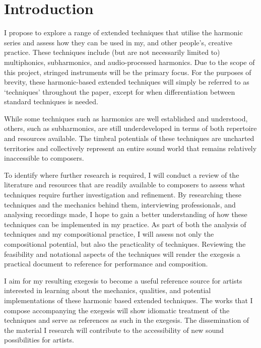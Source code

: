 \section{Introduction}
I propose to explore a range of extended techniques that utilise the harmonic series and assess how they can be used in my, and other people's, creative practice. These techniques include (but are not necessarily limited to) multiphonics, subharmonics, and audio-processed harmonics. Due to the scope of this project, stringed instruments will be the primary focus. For the purposes of brevity, these harmonic-based extended techniques will simply be referred to as `techniques' throughout the paper, except for when differentiation between standard techniques is needed. 

While some techniques such as harmonics are well established and understood, others, such as subharmonics, are still underdeveloped in terms of both repertoire and resources available.  The timbral potentials of these techniques are uncharted territories and collectively represent an entire sound world that remains relatively inaccessible to composers.

To identify where further research is required, I will conduct a review of the literature and resources that are readily available to composers to assess what techniques require further investigation and refinement. By researching these techniques and the mechanics behind them, interviewing professionals, and analysing recordings made, I hope to gain a better understanding of how these techniques can be implemented in my practice. As part of both the analysis of techniques and my compositional practice, I will assess not only the compositional potential, but also the practicality of techniques. Reviewing the feasibility and notational aspects of the techniques will render the exegesis a practical document to reference for performance and composition.

I aim for my resulting exegesis to become a useful reference source for artists interested in learning about the mechanics, qualities, and potential implementations of these harmonic based extended techniques. The works that I compose accompanying the exegesis will show idiomatic treatment of the techniques and serve as references as such in the exegesis. The dissemination of the material I research will contribute to the accessibility of new sound possibilities for artists.